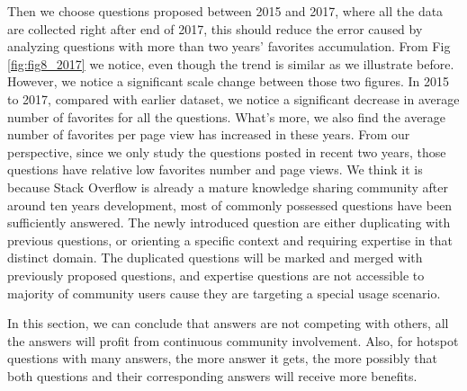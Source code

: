 Then we choose questions proposed between 2015 and 2017, where all the data are collected right after end of 2017, this should reduce the error caused by analyzing questions with more than two years' favorites accumulation. From Fig \ref{fig:fig8_2017} we notice, even though the trend is similar as we illustrate before. However, we notice a significant scale change between those two figures. In 2015 to 2017, compared with earlier dataset, we notice a significant decrease in average number of favorites for all the questions. What's more, we also find the average number of favorites per page view has increased in these years. From our perspective, since we only study the questions posted in recent two years, those questions have relative low favorites number and page views. We think it is because Stack Overflow is already a mature knowledge sharing community after around ten years development, most of commonly possessed questions have been sufficiently answered. The newly introduced question are either duplicating with previous questions, or orienting a specific context and requiring expertise in that distinct domain. The duplicated questions will be marked and merged with previously proposed questions, and expertise questions are not accessible to majority of community users cause they are targeting a special usage scenario. 

In this section, we can conclude that answers are not competing with others, all the answers will profit from continuous community involvement. Also, for hotspot questions with many answers, the more answer it gets, the more possibly that both questions and their corresponding answers will receive more benefits.